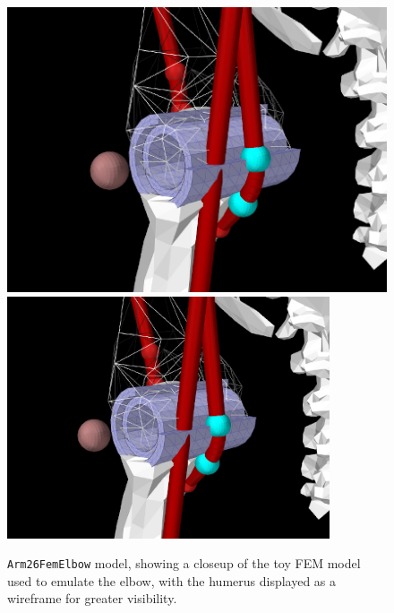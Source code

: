 \begin{figure}[ht]
\begin{center}
   \iflatexml 
      \includegraphics[]{images/Arm26FemElbow} 
   \else 
      \includegraphics[width=3.75in]{images/Arm26FemElbow} 
   \fi
\end{center}
\caption{{\tt Arm26FemElbow} model, showing a closeup of the
toy FEM model used to emulate the elbow, with the humerus displayed as a
wireframe for greater visibility.}
\label{Arm26FemElbow:fig}
\end{figure}

